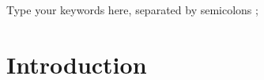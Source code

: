 \documentclass[5p,times,procedia]{elsarticle}
\begin{document}
\begin{frontmatter}
	\begin{keyword}
		Type your keywords here, separated by semicolons ;
		
		
		
		
	\end{keyword}
	
\end{frontmatter}



\section{Introduction}

%
%
%
%
%
\end{document}
